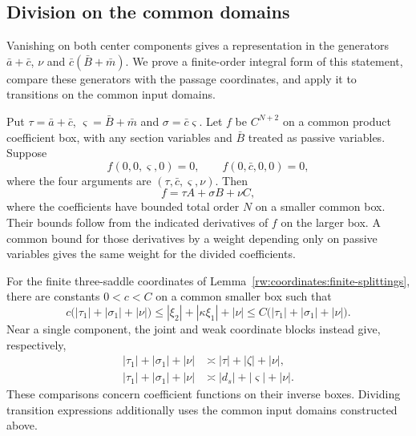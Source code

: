 \subsection{Division on the common domains}

Vanishing on both center components gives a representation in the
generators $\bar a+\bar c$, $\nu$ and $\bar c(\bar B+\bar m)$.
We prove a finite-order integral form of this statement, compare these
generators with the passage coordinates, and apply it to transitions
on the common input domains.

\begin{proposition}
\label{rw:generator-division}
Put $\tau=\bar a+\bar c$, $\varsigma=\bar B+\bar m$ and
$\sigma=\bar c\varsigma$. Let $f$ be $C^{N+2}$ on a common
product coefficient box, with any section variables and $\bar B$
treated as passive variables. Suppose
\[
 f(0,0,\varsigma,0)=0,\qquad
 f(0,\bar c,0,0)=0,
\]
where the four arguments are $(\tau,\bar c,\varsigma,\nu)$.
Then
\begin{equation}\label{rw:centers:double-division}
 f=\tau A+\sigma B+\nu C,
\end{equation}
where the coefficients have bounded total order $N$ on a smaller
common box. Their bounds follow from the indicated derivatives of
$f$ on the larger box. A common bound for those derivatives by a
weight depending only on passive variables gives the same weight for
the divided coefficients.

For the finite three-saddle coordinates of
Lemma~\ref{rw:coordinates:finite-splittings}, there are constants
$0<c<C$ on a common smaller box such that
\begin{equation}\label{rw:centers:ideal-comparison}
 c\bigl(|\tau_1|+|\sigma_1|+|\nu|\bigr)
 \le |\xi_2|+|\kappa\xi_1|+|\nu|
 \le C\bigl(|\tau_1|+|\sigma_1|+|\nu|\bigr).
\end{equation}
Near a single component, the joint and weak coordinate blocks instead
give, respectively,
\begin{equation}\label{rw:centers:single-ideal-comparison}
\begin{aligned}
 |\tau_1|+|\sigma_1|+|\nu|
   &\asymp |\tau|+|\zeta|+|\nu|,\\
 |\tau_1|+|\sigma_1|+|\nu|
   &\asymp |d_s|+|\varsigma|+|\nu|.
\end{aligned}
\end{equation}
These comparisons concern coefficient functions on their inverse
boxes. Dividing transition expressions additionally uses the common
input domains constructed above.
\end{proposition}

